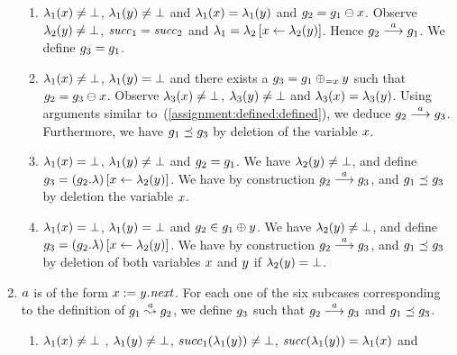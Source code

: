 \begin{enumerate}
\begin{enumerate}
\item
\label{assignment:defined:defined}
$\lambda_1(x)\neq\bot$,
$\lambda_1(y)\neq\bot$
and $\lambda_1(x)=\lambda_1(y)$ and 
$g_2=g_1\ominus{\ensuremath{x}}$.
%
Observe $\lambda_2(y)\neq\bot$, ${\it succ}_1={\it succ}_2$ and
$\lambda_1=\lambda_2\left[x\leftarrow\lambda_2(y)\right]$.
%
Hence $g_2\stackrel{a}{\longrightarrow}g_1$.
%
We define $g_3=g_1$.
\item
\label{assignment:defined:undefined}
$\lambda_1(x)\neq\bot$, $\lambda_1(y)=\bot$
and there exists a $g_3=g_1\oplus_{={x}}{y}$
such that $g_2=g_3\ominus{\ensuremath{x}}$.
%
Observe 
$\lambda_3(x)\neq\bot$,
$\lambda_3(y)\neq\bot$ and 
$\lambda_3(x)=\lambda_3(y)$.
%
Using arguments similar to~(\ref{assignment:defined:defined}),
we deduce $g_2\stackrel{a}{\longrightarrow}g_3$.
%
Furthermore, we have $g_1\preceq g_3$ by deletion of the 
variable $x$. 
%
\item
$\lambda_1(x)=\bot$, $\lambda_1(y)\neq\bot$
and $g_2=g_1$.
%
We have $\lambda_2(y)\neq\bot$, and define 
$g_3=\left(g_2.\lambda\right)\left[x\leftarrow\lambda_2(y)\right]$.
%
We have by construction $g_2\stackrel{a}{\longrightarrow}g_3$, and
$g_1\preceq g_3$ by deletion the variable $x$.
%
\item 
$\lambda_1(x)=\bot$, $\lambda_1(y)=\bot$ and
$g_2\in g_1\oplus{\ensuremath{y}}$.
%
We have $\lambda_2(y)\neq\bot$, and define 
$g_3=\left(g_2.\lambda\right)\left[x\leftarrow\lambda_2(y)\right]$.
%
We have by construction $g_2\stackrel{a}{\longrightarrow}g_3$, and
$g_1\preceq g_3$ by deletion of both variables $x$ and $y$
if $\lambda_2(y)=\bot$.
%
\end{enumerate}
%
%
%
\item
$a$ is of the form $x:=y.{\it next}$.
%
For each one of the six subcases corresponding to the definition 
of $g_1\stackrel{a}{\leadsto}g_2$, we define $g_3$ 
such that $g_2\stackrel{a}{\longrightarrow}g_3$
and $g_1\preceq g_3$.
% 
%
\begin{enumerate}
\item
\label{assignmentnext:defined:defined:defined}
$\lambda_1(x)\neq\bot$ , $\lambda_1(y)\neq\bot$, 
$succ_1(\lambda_1(y))\neq\bot$, 
${\it succ}(\lambda_1(y))=\lambda_1(x)$ and 

\end{enumerate}
\end{enumerate}
